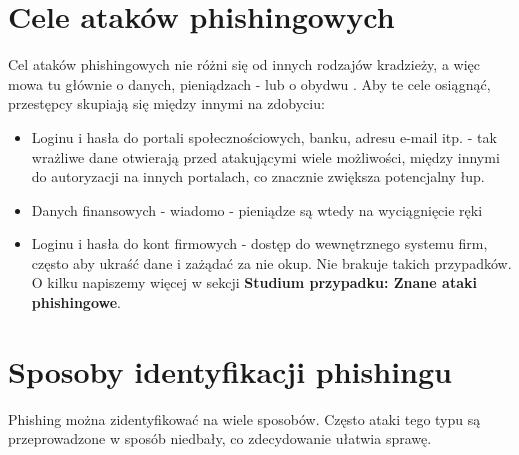 \documentclass[]{article}
\begin{document}
\section{Cele ataków phishingowych}
Cel ataków phishingowych nie różni się od innych rodzajów kradzieży, a więc mowa tu głównie o danych, pieniądzach - lub o obydwu \cite{identityguard}. Aby te cele osiągnąć, przestępcy skupiają się między innymi na zdobyciu:
\begin{itemize}[label=$\rightarrow$]
	\item Loginu i hasła do portali społecznościowych, banku, adresu e-mail itp. - tak wrażliwe dane otwierają przed atakującymi wiele możliwości, między innymi do autoryzacji na innych portalach, co znacznie zwiększa potencjalny łup.
	\item Danych finansowych - wiadomo - pieniądze są wtedy na wyciągnięcie ręki
	\item Loginu i hasła do kont firmowych - dostęp do wewnętrznego systemu firm, często aby ukraść dane i zażądać za nie okup. Nie brakuje takich przypadków. O kilku napiszemy więcej w sekcji {\bfseries Studium przypadku: Znane ataki phishingowe}.
\end{itemize}

\section{Sposoby identyfikacji phishingu}
Phishing można zidentyfikować na wiele sposobów. Często ataki tego typu są przeprowadzone w sposób niedbały, co zdecydowanie ułatwia sprawę.
\end{document}
